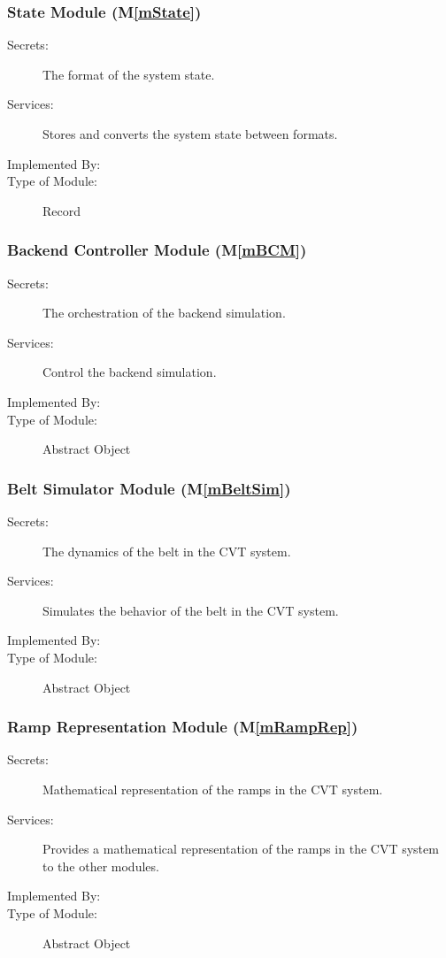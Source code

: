 \documentclass[12pt, titlepage]{article}
\newcommand{\mref}[1]{M\ref{#1}}
\begin{document}
\subsubsection{State Module (\mref{mState})}

\begin{description}
\item[Secrets:] The format of the system state.
\item[Services:] Stores and converts the system state between formats.
\item[Implemented By:] \progname{}
\item[Type of Module:] Record
\end{description}

\subsubsection{Backend Controller Module (\mref{mBCM})}

\begin{description}
\item[Secrets:] The orchestration of the backend simulation.
\item[Services:] Control the backend simulation.
\item[Implemented By:] \progname{}
\item[Type of Module:] Abstract Object
\end{description}

\subsubsection{Belt Simulator Module (\mref{mBeltSim})}

\begin{description}
\item[Secrets:] The dynamics of the belt in the CVT system.
\item[Services:] Simulates the behavior of the belt in the CVT system.
\item[Implemented By:] \progname{}
\item[Type of Module:] Abstract Object
\end{description}

\subsubsection{Ramp Representation Module (\mref{mRampRep})}

\begin{description}
\item[Secrets:] Mathematical representation of the ramps in the CVT system.
\item[Services:] Provides a mathematical representation of the ramps in the CVT system to the other modules.
\item[Implemented By:] \progname{}
\item[Type of Module:] Abstract Object
\end{description}
\end{document}
